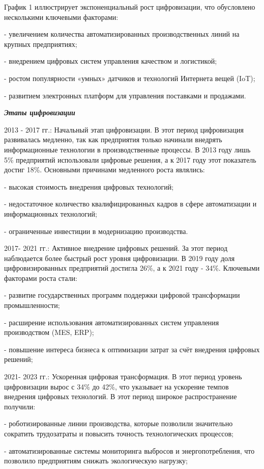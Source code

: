 \begin{multicols}{2}
График 1 иллюстрирует экспоненциальный рост цифровизации, что
обусловлено несколькими ключевыми факторами:

- увеличением количества автоматизированных производственных линий на
крупных предприятиях;

- внедрением цифровых систем управления качеством и логистикой;

- ростом популярности «умных» датчиков и технологий Интернета вещей
(IoT);

- развитием электронных платформ для управления поставками и продажами.

\emph{{\bfseries Этапы цифровизации}}

2013 - 2017 гг.: Начальный этап цифровизации. В этот период цифровизация
развивалась медленно, так как предприятия только начинали внедрять
информационные технологии в производственные процессы. В 2013 году лишь
5\% предприятий использовали цифровые решения, а к 2017 году этот
показатель достиг 18\%. Основными причинами медленного роста являлись:

- высокая стоимость внедрения цифровых технологий;

- недостаточное количество квалифицированных кадров в сфере
автоматизации и информационных технологий;

- ограниченные инвестиции в модернизацию производства.

2017- 2021 гг.: Активное внедрение цифровых решений. За этот период
наблюдается более быстрый рост уровня цифровизации. В 2019 году доля
цифровизированных предприятий достигла 26\%, а к 2021 году - 34\%.
Ключевыми факторами роста стали:

- развитие государственных программ поддержки цифровой трансформации
промышленности;

- расширение использования автоматизированных систем управления
производством (MES, ERP);

- повышение интереса бизнеса к оптимизации затрат за счёт внедрения
цифровых решений;

2021- 2023 гг.: Ускоренная цифровая трансформация. В этот период уровень
цифровизации вырос с 34\% до 42\%, что указывает на ускорение темпов
внедрения цифровых технологий. В этот период широкое распространение
получили:

- роботизированные линии производства, которые позволили значительно
сократить трудозатраты и повысить точность технологических процессов;

- автоматизированные системы мониторинга выбросов и энергопотребления,
что позволило предприятиям снижать экологическую нагрузку;


\end{multicols}
